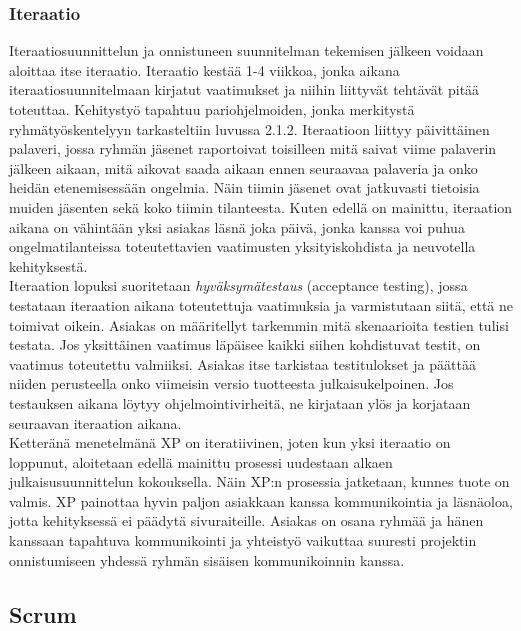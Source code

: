 \documentclass[finnish]{../tktltiki2}
\theoremstyle{definition}
\theoremstyle{remark}
\begin{document}
\subsubsection{Iteraatio}

Iteraatiosuunnittelun ja onnistuneen suunnitelman tekemisen jälkeen voidaan aloittaa itse iteraatio. Iteraatio kestää 1-4 viikkoa, jonka aikana iteraatiosuunnitelmaan kirjatut vaatimukset ja niihin liittyvät tehtävät pitää toteuttaa. Kehitystyö tapahtuu pariohjelmoiden, jonka
merkitystä ryhmätyöskentelyyn tarkasteltiin luvussa 2.1.2. Iteraatioon liittyy päivittäinen palaveri, jossa ryhmän jäsenet raportoivat toisilleen mitä saivat viime palaverin jälkeen aikaan, mitä aikovat saada aikaan ennen seuraavaa palaveria ja onko heidän etenemisessään ongelmia. Näin tiimin jäsenet ovat jatkuvasti tietoisia
muiden jäsenten sekä koko tiimin tilanteesta. Kuten edellä on mainittu, iteraation aikana on vähintään yksi asiakas läsnä joka päivä, jonka kanssa voi puhua ongelmatilanteissa toteutettavien vaatimusten yksityiskohdista ja neuvotella kehityksestä.\\

Iteraation lopuksi suoritetaan \emph{hyväksymätestaus} (acceptance testing), jossa testataan iteraation aikana toteutettuja vaatimuksia ja varmistutaan siitä, että ne toimivat oikein. Asiakas on määritellyt tarkemmin mitä skenaarioita testien tulisi testata. Jos yksittäinen vaatimus läpäisee kaikki siihen kohdistuvat testit, on vaatimus toteutettu valmiiksi. Asiakas itse tarkistaa testitulokset ja päättää niiden perusteella onko viimeisin versio tuotteesta julkaisukelpoinen. Jos testauksen aikana löytyy ohjelmointivirheitä, ne kirjataan ylös ja korjataan seuraavan iteraation aikana.\\

Ketteränä menetelmänä XP on iteratiivinen, joten kun yksi iteraatio on loppunut, aloitetaan edellä mainittu prosessi uudestaan alkaen julkaisusuunnittelun kokouksella. Näin XP:n prosessia jatketaan, kunnes tuote on valmis. XP painottaa hyvin paljon asiakkaan kanssa kommunikointia ja läsnäoloa, jotta kehityksessä ei päädytä sivuraiteille. Asiakas on osana ryhmää ja hänen kanssaan tapahtuva kommunikointi ja yhteistyö vaikuttaa suuresti projektin onnistumiseen yhdessä ryhmän sisäisen kommunikoinnin kanssa.

\subsection{Scrum}
\end{document}
